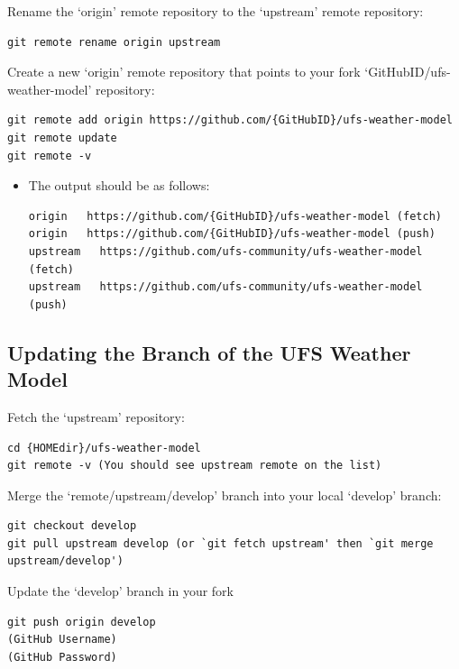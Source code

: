 \documentclass[11pt,fleqn]{report}              %
\begin{document}
Rename the `origin' remote repository to the `upstream' remote repository:
\lstset{language=bash}   
\begin{lstlisting}[frame=trBL]
git remote rename origin upstream
\end{lstlisting}

Create a new `origin' remote repository that points to your fork `{GitHubID}/ufs-weather-model' repository:
\lstset{language=bash}   
\begin{lstlisting}[frame=trBL]
git remote add origin https://github.com/{GitHubID}/ufs-weather-model
git remote update
git remote -v
\end{lstlisting}

\begin{itemize}
\item The output should be as follows:
\lstset{language=bash}   
\begin{lstlisting}[frame=trBL]
origin   https://github.com/{GitHubID}/ufs-weather-model (fetch)
origin   https://github.com/{GitHubID}/ufs-weather-model (push)
upstream   https://github.com/ufs-community/ufs-weather-model (fetch)
upstream   https://github.com/ufs-community/ufs-weather-model (push)
\end{lstlisting}
\end{itemize}


\subsection{Updating the Branch of the UFS Weather Model}

Fetch the `upstream' repository:
\lstset{language=bash}   
\begin{lstlisting}[frame=trBL]
cd {HOMEdir}/ufs-weather-model
git remote -v (You should see upstream remote on the list)
\end{lstlisting}

Merge the `remote/upstream/develop' branch into your local `develop' branch:
\lstset{language=bash}   
\begin{lstlisting}[frame=trBL]
git checkout develop
git pull upstream develop (or `git fetch upstream' then `git merge upstream/develop')
\end{lstlisting}

Update the `develop' branch in your fork
\lstset{language=bash}   
\begin{lstlisting}[frame=trBL]
git push origin develop
(GitHub Username)
(GitHub Password)
\end{lstlisting}
\end{document}
